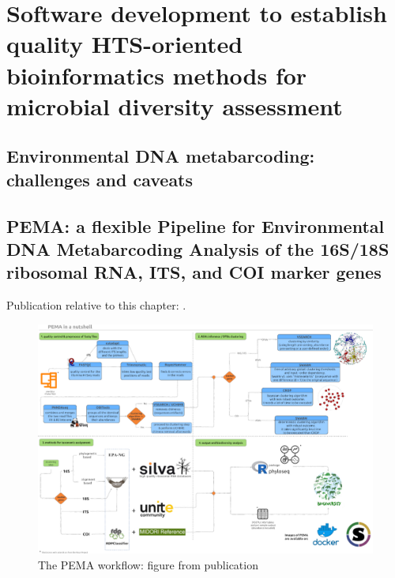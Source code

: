 % 
% 

\chapter{Software development to establish quality HTS-oriented bioinformatics methods for microbial diversity assessment}
\label{cha:2}


\section{Environmental DNA metabarcoding: challenges and caveats}


\newpage

\section{PEMA: a flexible Pipeline for Environmental DNA Metabarcoding Analysis of the 16S/18S ribosomal RNA, ITS, and COI marker genes}


Publication relative to this chapter: \cite{zafeiropoulos2020pema}. 


\begin{figure}[!htbp]
   \centering
   \includegraphics[width=0.95\columnwidth]{figures/pema_workflow.jpeg}
   \caption{The PEMA workflow: figure from publication}
\end{figure}



